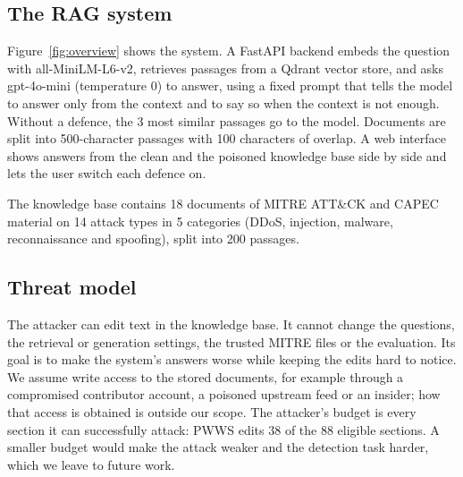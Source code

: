 \documentclass[10pt,journal,compsoc]{IEEEtran}
\begin{document}
\subsection{The RAG system}
Figure~\ref{fig:overview} shows the system. A FastAPI backend embeds the question with all-MiniLM-L6-v2, retrieves passages from a Qdrant vector store, and asks gpt-4o-mini (temperature 0) to answer, using a fixed prompt that tells the model to answer only from the context and to say so when the context is not enough. Without a defence, the 3 most similar passages go to the model. Documents are split into 500-character passages with 100 characters of overlap. A web interface shows answers from the clean and the poisoned knowledge base side by side and lets the user switch each defence on.

The knowledge base contains 18 documents of MITRE ATT\&CK and CAPEC material on 14 attack types in 5 categories (DDoS, injection, malware, reconnaissance and spoofing), split into 200 passages.

\subsection{Threat model}
The attacker can edit text in the knowledge base. It cannot change the questions, the retrieval or generation settings, the trusted MITRE files or the evaluation. Its goal is to make the system's answers worse while keeping the edits hard to notice. We assume write access to the stored documents, for example through a compromised contributor account, a poisoned upstream feed or an insider; how that access is obtained is outside our scope. The attacker's budget is every section it can successfully attack: PWWS edits 38 of the 88 eligible sections. A smaller budget would make the attack weaker and the detection task harder, which we leave to future work.
\end{document}
